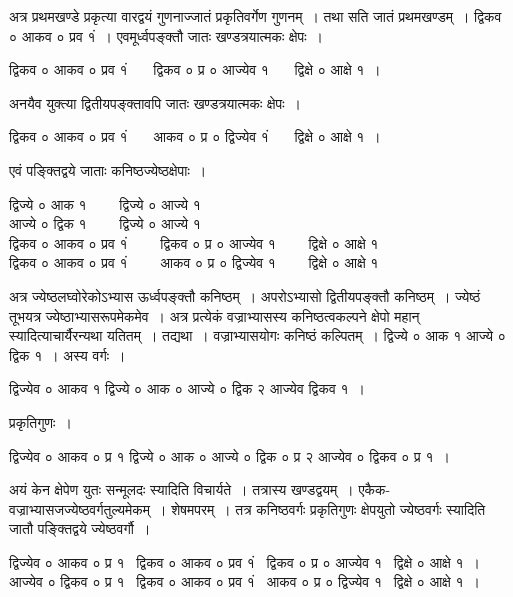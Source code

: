 \documentclass[11pt, openany]{book}
\begin{document}
\begin{sloppypar}
अत्र प्रथमखण्डे प्रकृत्या वारद्वयं गुणनाज्जातं प्रकृतिवर्गेण गुणनम्~। तथा सति जातं प्रथमखण्डम्~। द्विकव ० आकव ० प्रव १ं~। एवमूर्ध्वपङ्क्तौ जातः खण्डत्रयात्मकः क्षेपः~।

\begin{center}
द्विकव ० आकव ० प्रव १ं ~~~द्विकव ० प्र ० आज्येव १ ~~~द्विक्षे ० आक्षे १~।
\end{center}

अनयैव युक्त्या द्वितीयपङ्क्तावपि जातः खण्डत्रयात्मकः क्षेपः~।

\begin{center}
द्विकव ० आकव ० प्रव १ं ~~~आकव ० प्र ० द्विज्येव १ं ~~~द्विक्षे ० आक्षे १~। 
\end{center}

एवं पङ्क्तिद्वये जाताः कनिष्ठज्येष्ठक्षेपाः~।

\begin{center}
द्विज्ये ० आक १ ~~~~द्विज्ये ० आज्ये १\\
आज्ये ० द्विक १ ~~~~द्विज्ये ० आज्ये १\\
द्विकव ० आकव ० प्रव १ं ~~~~द्विकव ० प्र ० आज्येव १ ~~~~द्विक्षे ० आक्षे १\\
द्विकव ० आकव ० प्रव १ं ~~~~आकव ० प्र ० द्विज्येव १ ~~~~द्विक्षे ० आक्षे १
\end{center}

अत्र ज्येष्ठलघ्वोरेकोऽभ्यास ऊर्ध्वपङ्क्तौ कनिष्ठम्~। अपरोऽभ्यासो द्वितीयपङ्क्तौ कनिष्ठम्~। ज्येष्ठं तूभयत्र ज्येष्ठाभ्यासरूपमेकमेव~। अत्र प्रत्येकं वज्राभ्यासस्य कनिष्ठत्वकल्पने क्षेपो महान् स्यादित्याचार्यैरन्यथा यतितम्~। तद्यथा~। वज्राभ्यासयोगः कनिष्ठं कल्पितम्~। द्विज्ये ० आक १ आज्ये ० द्विक १~। अस्य वर्गः~। 

\begin{center}
द्विज्येव ० आकव १ द्विज्ये ० आक ० आज्ये ० द्विक २ आज्येव द्विकव १~।
\end{center}

प्रकृतिगुणः~।

\begin{center}
द्विज्येव ० आकव ० प्र १ द्विज्ये ० आक ० आज्ये ० द्विक ० प्र २ आज्येव ० द्विकव ० प्र १~।
\end{center}

अयं केन क्षेपेण युतः सन्मूलदः स्यादिति विचार्यते~। तत्रास्य खण्डद्वयम्~। एकैक-वज्राभ्यासजज्येष्ठवर्गतुल्यमेकम्~। शेषमपरम्~। तत्र कनिष्ठवर्गः प्रकृतिगुणः क्षेपयुतो ज्येष्ठवर्गः स्यादिति जातौ पङ्क्तिद्वये ज्येष्ठवर्गौ~।

\begin{center}
{\small द्विज्येव ० आकव ० प्र १ ~द्विकव ० आकव ० प्रव १ं ~द्विकव ० प्र ० आज्येव १ ~द्विक्षे ० आक्षे १~।\\
आज्येव ० द्विकव ० प्र १ ~द्विकव ० आकव ० प्रव १ं ~आकव ० प्र ० द्विज्येव १ ~द्विक्षे ० आक्षे १~।}
\end{center}


\end{sloppypar}
\end{document}

